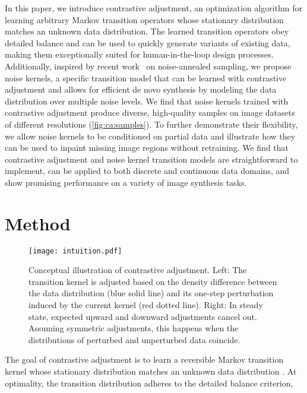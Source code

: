 \documentclass[10pt,twocolumn,letterpaper]{article}
\begin{document}
In this paper, we introduce contrastive adjustment, an optimization algorithm for learning arbitrary Markov transition operators whose stationary distribution matches an unknown data distribution.
The learned transition operators obey detailed balance and can be used to quickly generate variants of existing data, making them exceptionally suited for human-in-the-loop design processes.
Additionally, inspired by recent work~\cite{song2019generative,ho2020denoising} on noise-annealed sampling, we propose noise kernels, a specific transition model that can be learned with contrastive adjustment and allows for efficient de novo synthesis by modeling the data distribution over multiple noise levels.
We find that noise kernels trained with contrastive adjustment produce diverse, high-quality samples on image datasets of different resolutions (\cref{fig:ca:samples}).
To further demonstrate their flexibility, we allow noise kernels to be conditioned on partial data and illustrate how they can be used to inpaint missing image regions without retraining.
We find that contrastive adjustment and noise kernel transition models are straightforward to implement, can be applied to both discrete and continuous data domains, and show promising performance on a variety of image synthesis tasks.

\section{Method}

\begin{figure}[t]
  \centering
  \texttt{[image: intuition.pdf]}\caption{
    Conceptual illustration of contrastive adjustment.
    Left: The transition kernel is adjusted based on the density difference between the data distribution (blue solid line) and its one-step perturbation induced by the current kernel (red dotted line).
    Right: In steady state, expected upward and downward adjustments cancel out. Assuming symmetric adjustments, this happens when the distributions of perturbed and unperturbed data coincide.
  }\label{fig:ca:high-level}
\end{figure}

The goal of contrastive adjustment is to learn a reversible Markov transition kernel  whose stationary distribution matches an unknown data distribution .
At optimality, the transition distribution adheres to the detailed balance criterion,
\end{document}
